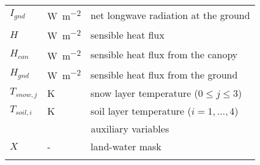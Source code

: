 \begin{table}[t]
\begin{tabular}{lll}
        $I_{gnd}$    & \unit{W~m^{-2}}         & net longwave radiation at the ground \\
        $H$          & \unit{W~m^{-2}}         & sensible heat flux \\
        $H_{can}$    & \unit{W~m^{-2}}         & sensible heat flux from the canopy \\
        $H_{gnd}$    & \unit{W~m^{-2}}         & sensible heat flux from the ground \\
        $T_{snow,j}$ & \unit{K}                & snow layer temperature ($0 \leq j \leq 3$) \\
        $T_{soil,i}$ & \unit{K}                & soil layer temperature ($i=1,\dots,4$) \\
        [1pt]
        \multicolumn{3}{c}{auxiliary variables}                                             \\
        $X$          & \unit{-}                & land-water mask \\
        \bottomhline
    \end{tabular}
\end{table}
